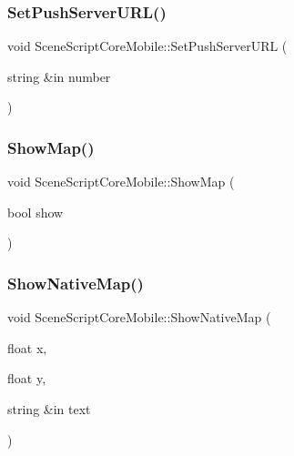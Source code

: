 \hypertarget{class_scene_script_core_mobile_a400acec3e49bed461f127b204f0368a5}{}\label{class_scene_script_core_mobile_a400acec3e49bed461f127b204f0368a5} 
\subsubsection{\texorpdfstring{Set\+Push\+Server\+U\+R\+L()}{SetPushServerURL()}}
{\footnotesize\ttfamily void Scene\+Script\+Core\+Mobile\+::\+Set\+Push\+Server\+U\+RL (\begin{DoxyParamCaption}\item[{string \&in}]{number }\end{DoxyParamCaption})}

\hypertarget{class_scene_script_core_mobile_a3bc72aff3ec6e1b8b16b2cd5e009b08d}{}\label{class_scene_script_core_mobile_a3bc72aff3ec6e1b8b16b2cd5e009b08d} 
\subsubsection{\texorpdfstring{Show\+Map()}{ShowMap()}}
{\footnotesize\ttfamily void Scene\+Script\+Core\+Mobile\+::\+Show\+Map (\begin{DoxyParamCaption}\item[{bool}]{show }\end{DoxyParamCaption})}

\hypertarget{class_scene_script_core_mobile_a64b526784ef4c35f5fd3c8064551ce3f}{}\label{class_scene_script_core_mobile_a64b526784ef4c35f5fd3c8064551ce3f} 
\subsubsection{\texorpdfstring{Show\+Native\+Map()}{ShowNativeMap()}}
{\footnotesize\ttfamily void Scene\+Script\+Core\+Mobile\+::\+Show\+Native\+Map (\begin{DoxyParamCaption}\item[{float}]{x,  }\item[{float}]{y,  }\item[{string \&in}]{text }\end{DoxyParamCaption})}

